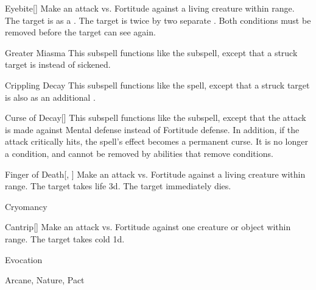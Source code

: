 \begin{ability}[\nth{3}]{Eyebite}[]
Make an attack vs. Fortitude against a living creature within \rngclose range.
\hit The target is  as a .
\crit The target is  twice by two separate .
Both conditions must be removed before the target can see again.
\end{ability}
\vspace{0.25em}


\begin{ability}[\nth{3}]{Greater Miasma}
This subspell functions like the  subspell, except that a struck target is  instead of sickened.
\end{ability}
\vspace{0.25em}


\begin{ability}[\nth{4}]{Crippling Decay}
This subspell functions like the  spell, except that a struck target is also  as an additional .
\end{ability}
\vspace{0.25em}


\begin{ability}[\nth{4}]{Curse of Decay}[]
This subspell functions like the  subspell, except that the attack is made against Mental defense instead of Fortitude defense.
In addition, if the attack critically hits, the spell's effect becomes a permanent curse.
It is no longer a condition, and cannot be removed by abilities that remove conditions.
\end{ability}
\vspace{0.25em}


\begin{ability}[\nth{5}]{Finger of Death}[, ]
Make an attack vs. Fortitude against a living creature within \rngclose range.
\hit The target takes life  \plus3d.
\crit The target immediately dies.
\end{ability}
\vspace{0.25em}

\newpage
\begin{spellsection}{Cryomancy}

\begin{spellheader}
\end{spellheader}


\begin{ability}{Cantrip}[]
Make an attack vs. Fortitude against one creature or object within \rngmed range.
\hit The target takes cold  \minus1d.
\end{ability}




 Evocation

 Arcane, Nature, Pact
\end{spellsection}


